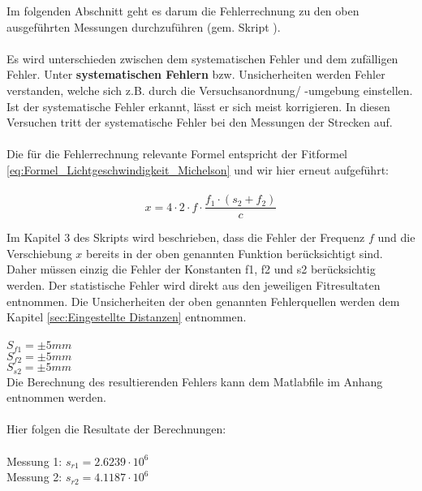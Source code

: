 Im folgenden Abschnitt geht es darum die Fehlerrechnung zu den oben ausgeführten Messungen durchzuführen (gem. Skript \cite{LOOSER2013}).\\
\\
Es wird unterschieden zwischen dem systematischen Fehler und dem zufälligen
Fehler. Unter \textbf{systematischen Fehlern} bzw. Unsicherheiten werden Fehler
verstanden, welche sich z.B. durch die Versuchsanordnung/ -umgebung einstellen. Ist der systematische Fehler erkannt, lässt er sich meist korrigieren. In diesen Versuchen tritt der systematische Fehler bei den Messungen der Strecken auf.\\
\\
Die für die Fehlerrechnung relevante Formel entspricht der Fitformel \ref{eq:Formel_Lichtgeschwindigkeit_Michelson} und wir hier erneut aufgeführt:\\
\\
\begin{equation}
x = 4\cdot 2 \cdot f \cdot \dfrac{f_{1} \cdot (s_{2}+f_{2})}{c}
\label{eq:Formel_Lichtgeschwindigkeit_Michelson_3}
\end{equation}

Im Kapitel 3 des Skripts \cite{FHNWO2} wird beschrieben, dass die Fehler der Frequenz $f$ und die Verschiebung $x$  bereits in der oben genannten Funktion berücksichtigt sind. Daher müssen einzig die Fehler der Konstanten f1, f2 und s2 berücksichtig werden. Der statistische Fehler wird direkt aus den jeweiligen Fitresultaten entnommen. Die Unsicherheiten der oben genannten Fehlerquellen werden dem Kapitel \ref{sec:Eingestellte Distanzen} entnommen.\\
\\
$S_{f1} = \pm 5 mm$	\\
$S_{f2} = \pm 5 mm$	\\
$S_{s2} = \pm 5 mm$	\\

Die Berechnung des resultierenden Fehlers kann dem Matlabfile im Anhang entnommen werden.\\
\\
Hier folgen die Resultate der Berechnungen:\\
\\
Messung 1: $s_{r1} = 2.6239 \cdot 10^6$\\
Messung 2: $s_{r2} = 4.1187 \cdot 10^6$\\
